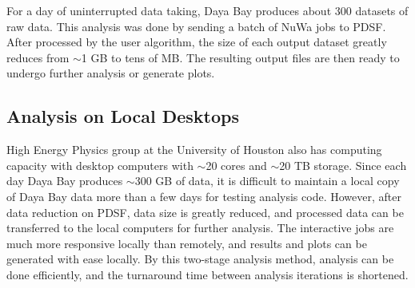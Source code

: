 
For a day of uninterrupted data taking, Daya Bay produces about 300 datasets of raw data. This analysis was done by sending a batch of NuWa jobs to PDSF. After processed by the user algorithm, the size of each output dataset greatly reduces from $\sim$1 GB to tens of MB. The resulting output files are then ready to undergo further analysis or generate plots.


\subsection{Analysis on Local Desktops}

High Energy Physics group at the University of Houston also has computing capacity with desktop computers with $\sim$20 cores and $\sim$20 TB storage. Since each day Daya Bay produces $\sim$300 GB of data, it is difficult to maintain a local copy of Daya Bay data more than a few days for testing analysis code. However, after data reduction on PDSF, data size is greatly reduced, and processed data can be transferred to the local computers for further analysis. The interactive jobs are much more responsive locally than remotely, and results and plots can be generated with ease locally. By this two-stage analysis method, analysis can be done efficiently, and the turnaround time between analysis iterations is shortened.